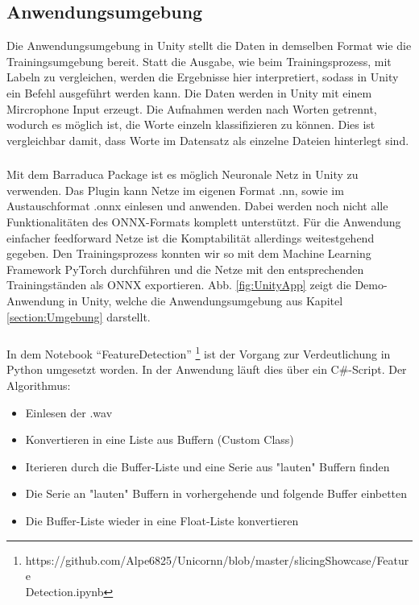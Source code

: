 \documentclass[sigconf]{acmart}
\begin{document}
\subsection{Anwendungsumgebung}
Die Anwendungsumgebung in Unity stellt die Daten in demselben Format wie die Trainingsumgebung bereit. Statt die Ausgabe, wie beim Trainingsprozess,  mit Labeln zu vergleichen, werden die Ergebnisse hier interpretiert, sodass in Unity ein Befehl ausgeführt werden kann. Die Daten werden in Unity mit einem Mircrophone Input erzeugt. Die Aufnahmen werden nach Worten getrennt, wodurch es möglich ist, die Worte einzeln klassifizieren zu können. Dies ist vergleichbar damit, dass Worte im Datensatz als einzelne Dateien hinterlegt sind. 

\subsubsection{}
Mit dem Barraduca Package ist es möglich Neuronale Netz in Unity zu verwenden. Das Plugin kann Netze im eigenen Format .nn, sowie im Austauschformat .onnx einlesen und anwenden. Dabei werden noch nicht alle Funktionalitäten des ONNX-Formats komplett unterstützt. Für die Anwendung einfacher feedforward Netze ist die Komptabilität allerdings weitestgehend gegeben. Den Trainingsprozess konnten wir so mit dem Machine Learning Framework PyTorch durchführen und die Netze mit den entsprechenden Trainingständen als ONNX exportieren. Abb. \ref{fig:UnityApp} zeigt die Demo-Anwendung in Unity, welche die Anwendungsumgebung aus Kapitel \ref{section:Umgebung} darstellt. 

\subsubsection{}
In dem Notebook “FeatureDetection” \footnote[1]{https://github.com/Alpe6825/Unicornn/blob/master/slicingShowcase/Feature\\Detection.ipynb}  ist der Vorgang zur Verdeutlichung  in Python umgesetzt worden. In der Anwendung läuft dies über ein C\#-Script. 
\newline
\newline
\noindent Der Algorithmus: 
\begin{itemize}
\item Einlesen der .wav
\item Konvertieren in eine Liste aus Buffern (Custom Class)
\item Iterieren durch die Buffer-Liste und eine Serie aus "lauten" Buffern finden
\item Die Serie an "lauten" Buffern in vorhergehende und folgende Buffer einbetten
\item Die Buffer-Liste wieder in eine Float-Liste konvertieren
\end{itemize}
\end{document}
